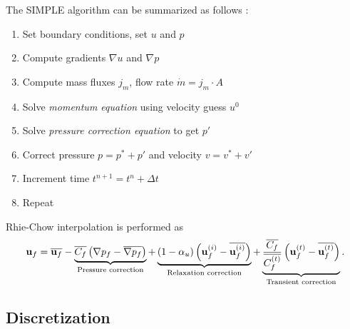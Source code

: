 \documentclass[12pt]{article}
\newcommand{\lb}{\left(}
\newcommand{\rb}{\right)}
\newcommand{\vb}[1]{\text{\textbf{#1}}}
\begin{document}
The SIMPLE algorithm can be summarized as follows \cite{mou, cws}:
\begin{enumerate}
\item Set boundary conditions, set $u$ and $p$
\item Compute gradients $\nabla u$ and $\nabla p$
\item Compute mass fluxes $j_m$, flow rate $\dot m = j_m \cdot A$
\item Solve \textit{momentum equation} using velocity guess $u^0$
\item Solve \textit{pressure correction equation} to get $p'$
\item Correct pressure $p = p^* + p'$ and velocity $v = v^* + v'$
\item Increment time $t^{n+1} = t^n + \Delta t$
\item Repeat
\end{enumerate}

Rhie-Chow interpolation is performed as
$$
\vb u_f = \overline{\vb u_f} - \underbrace{\overline{C_f} \lb \nabla p_f - \overline{\nabla p_f} \rb}_\text{Pressure correction} + \underbrace{(1 - \alpha_u) \lb \vb u_f^{(i)} - \overline{\vb u_f^{(i)}} \rb}_\text{Relaxation correction} + \underbrace{\frac{\overline{C_f}}{\overline{C_f^{(t)}}} \lb \vb u_f^{(t)} - \overline{\vb u_f^{(t)}} \rb}_\text{Transient correction}.
$$

\subsection{Discretization}
\end{document}
